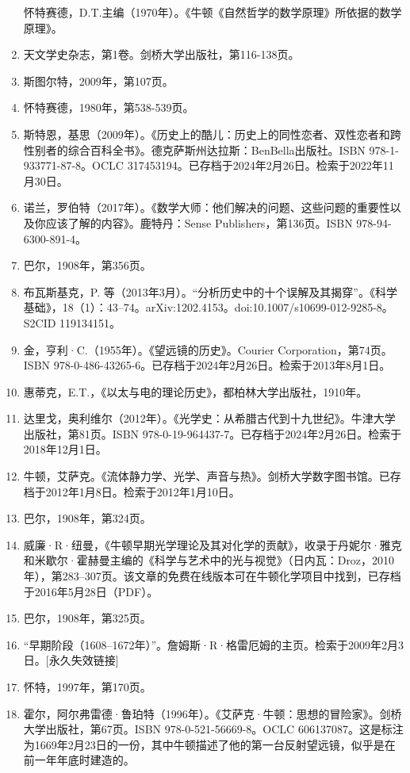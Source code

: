\begin{enumerate}
怀特赛德，D.T.主编（1970年）。《牛顿《自然哲学的数学原理》所依据的数学原理》。\item 天文学史杂志，第1卷。剑桥大学出版社，第116-138页。
\item 斯图尔特，2009年，第107页。  
\item 怀特赛德，1980年，第538-539页。  
\item 斯特恩，基思（2009年）。《历史上的酷儿：历史上的同性恋者、双性恋者和跨性别者的综合百科全书》。德克萨斯州达拉斯：BenBella出版社。ISBN 978-1-933771-87-8。OCLC 317453194。已存档于2024年2月26日。检索于2022年11月30日。  
\item 诺兰，罗伯特（2017年）。《数学大师：他们解决的问题、这些问题的重要性以及你应该了解的内容》。鹿特丹：Sense Publishers，第136页。ISBN 978-94-6300-891-4。  
\item 巴尔，1908年，第356页。  
\item 布瓦斯基克，P. 等（2013年3月）。“分析历史中的十个误解及其揭穿”。《科学基础》，18（1）：43–74。arXiv:1202.4153。doi:10.1007/s10699-012-9285-8。S2CID 119134151。
\item 金，亨利·C.（1955年）。《望远镜的历史》。Courier Corporation，第74页。ISBN 978-0-486-43265-6。已存档于2024年2月26日。检索于2013年8月1日。  
\item 惠蒂克，E.T.，《以太与电的理论历史》，都柏林大学出版社，1910年。  
\item 达里戈，奥利维尔（2012年）。《光学史：从希腊古代到十九世纪》。牛津大学出版社，第81页。ISBN 978-0-19-964437-7。已存档于2024年2月26日。检索于2018年12月1日。  
\item 牛顿，艾萨克。《流体静力学、光学、声音与热》。剑桥大学数字图书馆。已存档于2012年1月8日。检索于2012年1月10日。  
\item 巴尔，1908年，第324页。
\item 威廉·R·纽曼，《牛顿早期光学理论及其对化学的贡献》，收录于丹妮尔·雅克和米歇尔·霍赫曼主编的《科学与艺术中的光与视觉》（日内瓦：Droz，2010年），第283–307页。该文章的免费在线版本可在牛顿化学项目中找到，已存档于2016年5月28日（PDF）。  
\item 巴尔，1908年，第325页。  
\item “早期阶段（1608–1672年）”。詹姆斯·R·格雷厄姆的主页。检索于2009年2月3日。[永久失效链接]  
\item 怀特，1997年，第170页。  
\item 霍尔，阿尔弗雷德·鲁珀特（1996年）。《艾萨克·牛顿：思想的冒险家》。剑桥大学出版社，第67页。ISBN 978-0-521-56669-8。OCLC 606137087。这是标注为1669年2月23日的一份，其中牛顿描述了他的第一台反射望远镜，似乎是在前一年年底时建造的。  

\end{enumerate}
